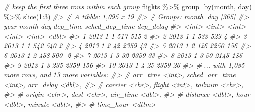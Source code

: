 \documentclass[
]{book}
\newenvironment{Shaded}{\begin{snugshade}}{\end{snugshade}}
\newcommand{\CommentTok}[1]{\textcolor[rgb]{0.56,0.35,0.01}{\textit{#1}}}
\newcommand{\DecValTok}[1]{\textcolor[rgb]{0.00,0.00,0.81}{#1}}
\newcommand{\FunctionTok}[1]{\textcolor[rgb]{0.00,0.00,0.00}{#1}}
\newcommand{\NormalTok}[1]{#1}
\newcommand{\SpecialCharTok}[1]{\textcolor[rgb]{0.00,0.00,0.00}{#1}}
\begin{document}
\begin{Shaded}
\begin{Highlighting}[]
\CommentTok{\# keep the first three rows within each group}
\NormalTok{flights }\SpecialCharTok{\%\textgreater{}\%} \FunctionTok{group\_by}\NormalTok{(month, day) }\SpecialCharTok{\%\textgreater{}\%} \FunctionTok{slice}\NormalTok{(}\DecValTok{1}\SpecialCharTok{:}\DecValTok{3}\NormalTok{)}
\CommentTok{\#\textgreater{} \# A tibble: 1,095 x 19}
\CommentTok{\#\textgreater{} \# Groups:   month, day [365]}
\CommentTok{\#\textgreater{}     year month   day dep\_time sched\_dep\_time dep\_delay}
\CommentTok{\#\textgreater{}    \textless{}int\textgreater{} \textless{}int\textgreater{} \textless{}int\textgreater{}    \textless{}int\textgreater{}          \textless{}int\textgreater{}     \textless{}dbl\textgreater{}}
\CommentTok{\#\textgreater{}  1  2013     1     1      517            515         2}
\CommentTok{\#\textgreater{}  2  2013     1     1      533            529         4}
\CommentTok{\#\textgreater{}  3  2013     1     1      542            540         2}
\CommentTok{\#\textgreater{}  4  2013     1     2       42           2359        43}
\CommentTok{\#\textgreater{}  5  2013     1     2      126           2250       156}
\CommentTok{\#\textgreater{}  6  2013     1     2      458            500        {-}2}
\CommentTok{\#\textgreater{}  7  2013     1     3       32           2359        33}
\CommentTok{\#\textgreater{}  8  2013     1     3       50           2145       185}
\CommentTok{\#\textgreater{}  9  2013     1     3      235           2359       156}
\CommentTok{\#\textgreater{} 10  2013     1     4       25           2359        26}
\CommentTok{\#\textgreater{} \# ... with 1,085 more rows, and 13 more variables:}
\CommentTok{\#\textgreater{} \#   arr\_time \textless{}int\textgreater{}, sched\_arr\_time \textless{}int\textgreater{}, arr\_delay \textless{}dbl\textgreater{},}
\CommentTok{\#\textgreater{} \#   carrier \textless{}chr\textgreater{}, flight \textless{}int\textgreater{}, tailnum \textless{}chr\textgreater{},}
\CommentTok{\#\textgreater{} \#   origin \textless{}chr\textgreater{}, dest \textless{}chr\textgreater{}, air\_time \textless{}dbl\textgreater{},}
\CommentTok{\#\textgreater{} \#   distance \textless{}dbl\textgreater{}, hour \textless{}dbl\textgreater{}, minute \textless{}dbl\textgreater{},}
\CommentTok{\#\textgreater{} \#   time\_hour \textless{}dttm\textgreater{}}


\end{Highlighting}
\end{Shaded}
\end{document}
